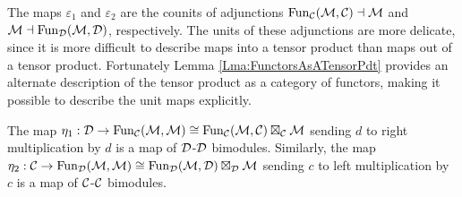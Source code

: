 \documentclass{amsart}
\begin{document}
The maps $\varepsilon_1$ and $\varepsilon_2$ are the counits of adjunctions $\operatorname{Fun}_{\mathcal C}(\mathcal M, \mathcal C) \dashv \mathcal M$ and $\mathcal M \dashv \operatorname{Fun}_{{\mathcal D}}(\mathcal M, \mathcal D)$, respectively. The units of these adjunctions are more delicate, since it is more difficult to describe maps into a tensor product than maps out of a tensor product. Fortunately Lemma \ref{Lma:FunctorsAsATensorPdt} provides an alternate description of the tensor product as a category of functors, making it possible  to describe the unit maps explicitly. 




\begin{lemma}
The map $\eta_1: \mathcal D \rightarrow \operatorname{Fun}_{\mathcal C}(\mathcal M,\mathcal M) \cong \operatorname{Fun}_{\mathcal C}(\mathcal M,\mathcal C) \boxtimes_\mathcal C \mathcal M$ sending $d$ to right multiplication by $d$ is a map of $\mathcal D$-$\mathcal D$ bimodules.  Similarly, the map $\eta_2: \mathcal C \rightarrow \operatorname{Fun}_{\mathcal D}(\mathcal M,\mathcal M) \cong \operatorname{Fun}_{\mathcal D}(\mathcal M,\mathcal D) \boxtimes_\mathcal D \mathcal M$ sending $c$ to left multiplication by $c$ is a map of $\mathcal C$-$\mathcal C$ bimodules.
\end{lemma}
\end{document}
